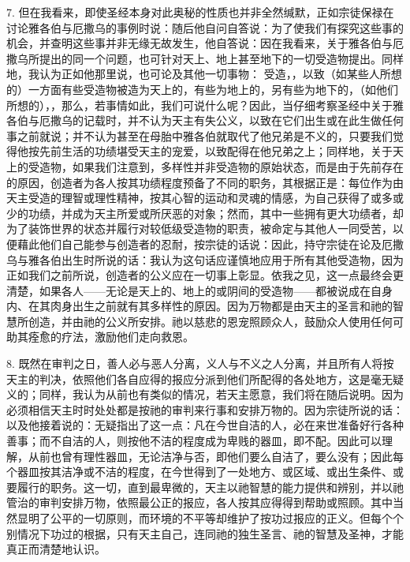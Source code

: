 7. 但在我看来，即使圣经本身对此奥秘的性质也并非全然缄默，正如宗徒保禄在讨论雅各伯与厄撒乌的事例时说：随后他自问自答说：为了使我们有探究这些事的机会，并查明这些事并非无缘无故发生，他自答说：因在我看来，关于雅各伯与厄撒乌所提出的同一个问题，也可针对天上、地上甚至地下的一切受造物提出。同样地，我认为正如他那里说，也可论及其他一切事物： 受造，，以致（如某些人所想的）一方面有些受造物被造为天上的，有些为地上的，另有些为地下的，（如他们所想的），，那么，若事情如此，我们可说什么呢？因此，当仔细考察圣经中关于雅各伯与厄撒乌的记载时，并不认为天主有失公义，以致在它们出生或在此生做任何事之前就说；并不认为甚至在母胎中雅各伯就取代了他兄弟是不义的，只要我们觉得他按先前生活的功绩堪受天主的宠爱，以致配得在他兄弟之上；同样地，关于天上的受造物，如果我们注意到，多样性并非受造物的原始状态，而是由于先前存在的原因，创造者为各人按其功绩程度预备了不同的职务，其根据正是：每位作为由天主受造的理智或理性精神，按其心智的运动和灵魂的情感，为自己获得了或多或少的功绩，并成为天主所爱或所厌恶的对象；然而，其中一些拥有更大功绩者，却为了装饰世界的状态并履行对较低级受造物的职责，被命定与其他人一同受苦，以便藉此他们自己能参与创造者的忍耐，按宗徒的话说：因此，持守宗徒在论及厄撒乌与雅各伯出生时所说的话：我认为这句话应谨慎地应用于所有其他受造物，因为正如我们之前所说，创造者的公义应在一切事上彰显。依我之见，这一点最终会更清楚，如果各人——无论是天上的、地上的或阴间的受造物——都被说成在自身内、在其肉身出生之前就有其多样性的原因。因为万物都是由天主的圣言和祂的智慧所创造，并由祂的公义所安排。祂以慈悲的恩宠照顾众人，鼓励众人使用任何可助其痊愈的疗法，激励他们走向救恩。\par

8. 既然在审判之日，善人必与恶人分离，义人与不义之人分离，并且所有人将按天主的判决，依照他们各自应得的报应分派到他们所配得的各处地方，这是毫无疑义的；同样，我认为从前也有类似的情况，若天主愿意，我们将在随后说明。因为必须相信天主时时处处都是按祂的审判来行事和安排万物的。因为宗徒所说的话：以及他接着说的：无疑指出了这一点：凡在今世自洁的人，必在来世准备好行各种善事；而不自洁的人，则按他不洁的程度成为卑贱的器皿，即不配。因此可以理解，从前也曾有理性器皿，无论洁净与否，即他们要么自洁了，要么没有；因此每个器皿按其洁净或不洁的程度，在今世得到了一处地方、或区域、或出生条件、或要履行的职务。这一切，直到最卑微的，天主以祂智慧的能力提供和辨别，并以祂管治的审判安排万物，依照最公正的报应，各人按其应得得到帮助或照顾。其中当然显明了公平的一切原则，而环境的不平等却维护了按功过报应的正义。但每个个别情况下功过的根据，只有天主自己，连同祂的独生圣言、祂的智慧及圣神，才能真正而清楚地认识。\par

